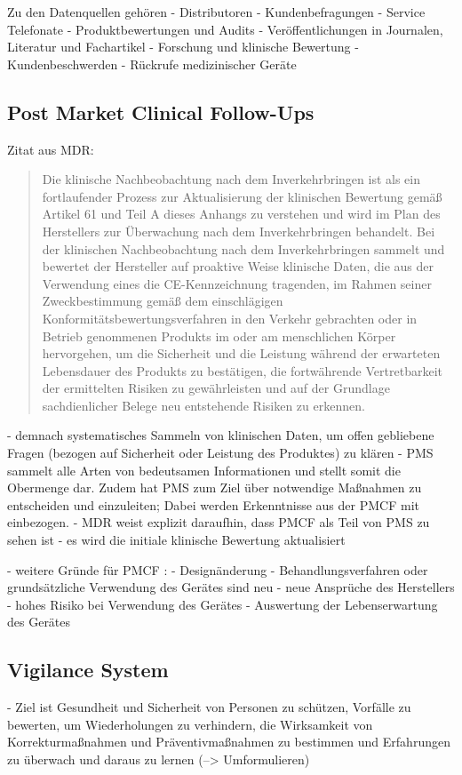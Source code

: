 \documentclass[a4paper,12pt]{report}
\begin{document}
Zu den Datenquellen gehören \citep[vgl.][S. 285-288]{Abuhav2012}
 - Distributoren
 - Kundenbefragungen
 - Service Telefonate
 - Produktbewertungen und Audits
 - Veröffentlichungen in Journalen, Literatur und Fachartikel
 - Forschung und klinische Bewertung
 - Kundenbeschwerden
 - Rückrufe medizinischer Geräte

\subsection{Post Market Clinical Follow-Ups}\label{subsec:PMCF}
Zitat aus MDR:
\begin{quote}
Die klinische Nachbeobachtung nach dem Inverkehrbringen ist als ein fortlaufender Prozess zur Aktualisierung der klinischen Bewertung gemäß Artikel 61 und Teil A dieses Anhangs zu verstehen und wird im Plan des Herstellers zur Überwachung nach dem Inverkehrbringen behandelt. Bei der klinischen Nachbeobachtung nach dem Inverkehrbringen sammelt und bewertet der Hersteller auf proaktive Weise klinische Daten, die aus der Verwendung eines die CE-Kennzeichnung tragenden, im Rahmen seiner Zweckbestimmung gemäß dem einschlägigen Konformitätsbewertungsverfahren in den Verkehr gebrachten oder in Betrieb genommenen Produkts im oder am menschlichen Körper hervorgehen, um die Sicherheit und die Leistung während der erwarteten Lebensdauer des Produkts zu bestätigen, die fortwährende Vertretbarkeit der ermittelten Risiken zu gewährleisten und auf der Grundlage sachdienlicher Belege neu entstehende Risiken zu erkennen.\citep[Anhang XIV Teil A 5.]{MDR2017}
\end{quote}
- demnach systematisches Sammeln von klinischen Daten, um offen gebliebene Fragen (bezogen auf Sicherheit oder Leistung des Produktes) zu klären
- PMS sammelt alle Arten von bedeutsamen Informationen und stellt somit die Obermenge dar. Zudem hat PMS zum Ziel über notwendige Maßnahmen zu entscheiden und einzuleiten; Dabei werden Erkenntnisse aus der PMCF mit einbezogen.
- MDR weist explizit daraufhin, dass PMCF als Teil von PMS zu sehen ist\citep[vgl.][]{Johner2017}
- es wird die initiale klinische Bewertung aktualisiert\citep[vgl.][S. 286]{Abuhav2012}

- weitere Gründe für PMCF \citep[vgl.][S. 287]{Abuhav2012}:
  - Designänderung
  - Behandlungsverfahren oder grundsätzliche Verwendung des Gerätes sind neu
  - neue Ansprüche des Herstellers
  - hohes Risiko bei Verwendung des Gerätes
  - Auswertung der Lebenserwartung des Gerätes

\subsection{Vigilance System}\label{subsec:Vigilance}
- Ziel ist Gesundheit und Sicherheit von Personen zu schützen, Vorfälle zu bewerten, um Wiederholungen zu verhindern, die Wirksamkeit von Korrekturmaßnahmen und Präventivmaßnahmen zu bestimmen und Erfahrungen zu überwach und daraus zu lernen (--> Umformulieren) \citep[vgl.][S. 1]{Pugh2017}
\end{document}
